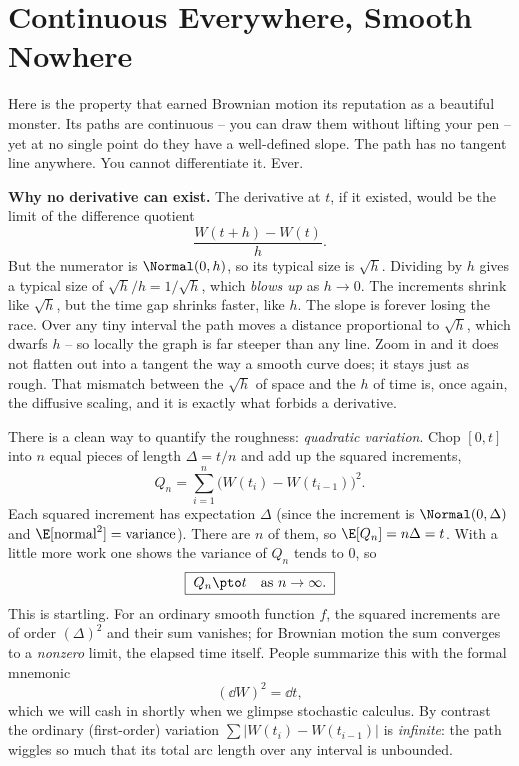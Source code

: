 \section{Continuous Everywhere, Smooth Nowhere}
\label{ch29:nowhere-diff}

Here is the property that earned Brownian motion its reputation as a beautiful
monster. Its paths are continuous -- you can draw them without lifting your pen --
yet at no single point do they have a well-defined slope. The path has no
tangent line anywhere. You cannot differentiate it. Ever.

\begin{happeningbox}
\textbf{Why no derivative can exist.} The derivative at $t$, if it existed, would
be the limit of the difference quotient
\[
  \frac{W(t+h)-W(t)}{h}.
\]
But the numerator is $\Normal(0,h)$, so its typical size is $\sqrt h$. Dividing by
$h$ gives a typical size of $\sqrt h / h = 1/\sqrt h$, which \emph{blows up} as
$h\to0$. The increments shrink like $\sqrt h$, but the time gap shrinks faster,
like $h$. The slope is forever losing the race. Over any tiny interval the path
moves a distance proportional to $\sqrt h$, which dwarfs $h$ -- so locally the
graph is far steeper than any line. Zoom in and it does not flatten out into a
tangent the way a smooth curve does; it stays just as rough. That mismatch
between the $\sqrt h$ of space and the $h$ of time is, once again, the diffusive
scaling, and it is exactly what forbids a derivative.
\end{happeningbox}

There is a clean way to quantify the roughness: \emph{quadratic variation}. Chop
$[0,t]$ into $n$ equal pieces of length $\Delta = t/n$ and add up the squared
increments,
\[
  Q_n = \sum_{i=1}^{n}\Big(W(t_i)-W(t_{i-1})\Big)^2 .
\]
Each squared increment has expectation $\Delta$ (since the increment is
$\Normal(0,\Delta)$ and $\E[\text{normal}^2]=\text{variance}$). There are $n$ of
them, so $\E[Q_n] = n\Delta = t$. With a little more work one shows the variance
of $Q_n$ tends to $0$, so
\[
  \boxed{\;Q_n \pto t \quad\text{as } n\to\infty.\;}
\]
This is startling. For an ordinary smooth function $f$, the squared increments are
of order $(\Delta)^2$ and their sum vanishes; for Brownian motion the sum
converges to a \emph{nonzero} limit, the elapsed time itself. People summarize
this with the formal mnemonic
\[
  (\dd W)^2 = \dd t,
\]
which we will cash in shortly when we glimpse stochastic calculus. By contrast the
ordinary (first-order) variation $\sum |W(t_i)-W(t_{i-1})|$ is \emph{infinite}:
the path wiggles so much that its total arc length over any interval is unbounded.

